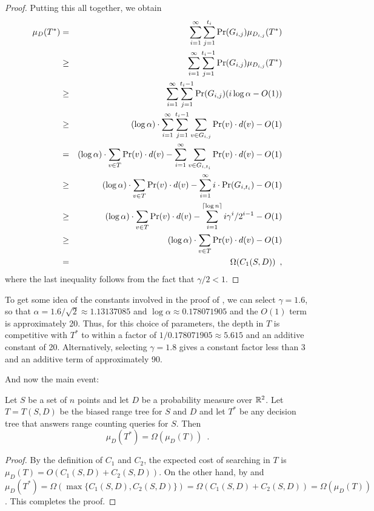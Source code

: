 \documentclass[charterfonts]{patmorin}
\newcommand{\depth}{d}
\begin{document}
\begin{proof}
Putting this all together, we obtain
\begin{eqnarray*}
\mu_D(T^*) 
  & = & \sum_{i=1}^{\infty}\sum_{j=1}^{t_i}\Pr(G_{i,j})\mu_{D_{i,j}}(T^*) \\
  & \ge & \sum_{i=1}^{\infty}
    \sum_{j=1}^{t_i-1}\Pr(G_{i,j})\mu_{D_{i,j}}(T^*) \\
  & \ge & \sum_{i=1}^{\infty}\sum_{j=1}^{t_i-1}
           \Pr(G_{i,j})( i\log\alpha -O(1)) \\
  & \ge & (\log\alpha)\cdot
         \sum_{i=1}^{\infty}\sum_{j=1}^{t_i-1}
		\sum_{v\in G_{i,j}}\Pr(v)\cdot\depth(v) - O(1)\\
  & = & (\log\alpha)\cdot\sum_{v\in T}\Pr(v)\cdot \depth(v)
          -    \sum_{i=1}^{\infty}
		\sum_{v\in G_{i,t_i}}\Pr(v)\cdot\depth(v) - O(1)\\
  & \ge & (\log\alpha)\cdot\sum_{v\in T}\Pr(v)\cdot \depth(v)
          -    \sum_{i=1}^{\infty}i\cdot\Pr(G_{i,t_i}) - O(1) \\
  & \ge & (\log\alpha)\cdot\sum_{v\in T}\Pr(v)\cdot \depth(v)
          -    \sum_{i=1}^{\ceil{\log n}}i\gamma^i/2^{i-1} - O(1) \\
  & \ge &  (\log\alpha)\cdot\sum_{v\in T}\Pr(v)\cdot \depth(v) - O(1) \\
  & = & \Omega(C_1(S,D)) \enspace ,
\end{eqnarray*}
where the last inequality follows from the fact that $\gamma/2 < 1$. 
\end{proof}

To get some idea of the constants involved in the proof of
, we can select $\gamma=1.6$, so that
$\alpha=1.6/\sqrt{2}\approx 1.13137085$ and $\log \alpha \approx
0.178071905$ and the $O(1)$ term is approximately 20.  Thus, for this
choice of parameters, the depth in $T$ is competitive with $T^*$ to
within a factor of $1/0.178071905\approx 5.615$ and an additive
constant of 20.  Alternatively, selecting $\gamma=1.8$ gives a
constant factor less than 3 and an additive term of approximately 90.

And now the main event:

\begin{thm}
Let $S$ be a set of $n$ points and let $D$ be a probability measure
over $\mathbb{R}^2$.
Let $T=T(S,D)$ be the biased range tree for $S$ and $D$ and 
let $T^*$ be any decision
tree that answers range counting queries for $S$.  Then
\[
  \mu_D(T^*) = \Omega(\mu_D(T)) \enspace .
\]
\end{thm}

\begin{proof}
By the definition of $C_1$ and $C_2$, the expected cost of searching in
$T$ is $\mu_D(T)=O(C_1(S,D)+C_2(S,D))$.  On the other hand, by
 and  $\mu_D(T^*) =
\Omega(\max\{C_1(S,D),C_2(S,D)\}) =
\Omega(C_1(S,D)+C_2(S,D))=\Omega(\mu_D(T))$.  This completes the proof.
\end{proof}
\end{document}
